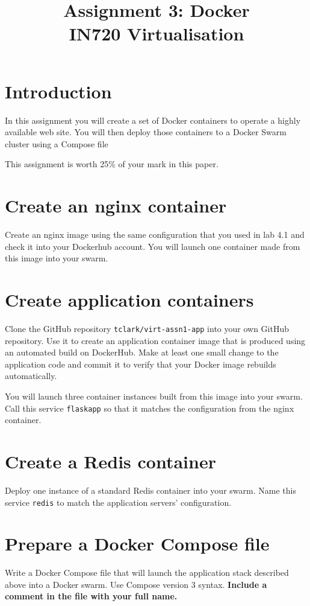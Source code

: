\documentclass{article}
\begin{document}
\title{Assignment 3: Docker \\ IN720 Virtualisation}
\date{}
\maketitle

\section*{Introduction}
In this assignment you will create a set of Docker containers to operate a highly available web site.  You will then deploy those containers to a Docker Swarm cluster using a Compose file

This assignment is worth 25\% of your mark in this paper.

\section{Create an nginx container}
Create an nginx image using the same configuration that you used in lab 4.1 and check it into your Dockerhub account. You will launch one container made from this image into your swarm.
 
\section{Create application containers}
Clone the GitHub repository \texttt{tclark/virt-assn1-app} into your own GitHub repository. Use it to create an application container image that is produced using an automated build on DockerHub. Make at least one small change to the application code and commit it to verify that your Docker image rebuilds automatically.

You will launch three container instances built from this image into your swarm. Call this service \texttt{flaskapp} so that it matches the configuration from the nginx container. 

\section{Create a Redis container}
Deploy one instance of a standard Redis container into your swarm. Name this service \texttt{redis} to match the application servers' configuration.

\section{Prepare a Docker Compose file}
Write a Docker Compose file that will launch the application stack described above into a Docker swarm. Use Compose version 3 syntax. \textbf{Include a comment in the file with your full name.}
\end{document}
